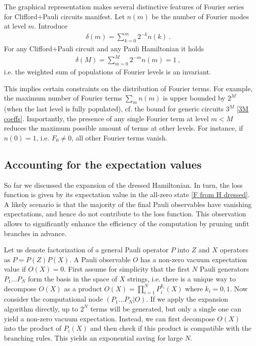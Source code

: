 \documentclass[twocolumn, amsfonts, amssymb, aps, nofootinbib]{revtex4-2}
\newcommand{\CP}{Clifford+Pauli}
\begin{document}
The graphical representation makes several distinctive features of Fourier series for \CP{} circuits manifest. Let $n(m)$ be the number of Fourier modes at level $m$. Introduce
\begin{align}
	\delta(m)=\sum_{k=0}^m2^{-k}n(k) \label{delta def} \ .
\end{align}
For any \CP{} circuit and any Pauli Hamiltonian it holds
\begin{align}
\delta(M)=\sum_{m=0}^M 2^{-m}n(m)=1 \ , \label{invariant}
\end{align}
i.e. the weighted sum of populations of Fourier levels is an invariant. 

This implies certain constraints on the distribution of Fourier terms. For example, the maximum number of Fourier terms $\sum_m n(m)$ is upper bounded by $2^M$ (when the last level is fully populated), cf. the bound for generic circuits $3^M$ \eqref{3M coeffs}. Importantly, the presence of any single Fourier term at level $m<M$ reduces the maximum possible amount of terms at other levels. For instance, if $n(0)=1$, i.e. $F_0\neq0$, all other Fourier terms vanish. 
\subsection{Accounting for the expectation values} \label{sec pruning}
So far we discussed the expansion of the dressed Hamiltonian. In turn, the loss function  is given by its expectation value in the all-zero state \eqref{F from H dressed}. A likely scenario is that the majority of the final Pauli observables have vanishing expectations, and hence do not contribute to the loss function. This observation allows to significantly enhance the efficiency of the computation by pruning unfit branches in advance.

Let us denote factorization of a general Pauli operator $P$ into $Z$ and $X$ operators as $P=P(Z)P(X)$. A Pauli observable $O$ has a non-zero vacuum expectation value if $O(X)=0$. 
First assume for simplicity that the first $N$ Pauli generators $P_1\dots P_N$ form the basis in the space of $X$ strings, i.e. there is a unique way to decompose $O(X)$ as a product $O(X)=\prod_{i=1}^N P^{k_i}_i(X)$ where $k_i=0,1$. Now consider the computational node $(P_1\dots P_N|O)$. If we apply the expansion algorithm directly, up to $2^N$ terms will be generated, but only a single one can yield a non-zero vacuum expectation. Instead, we can first decompose $O(X)$ into the product of $P_i(X)$ and then check if this product is compatible with the branching rules. This yields an exponential saving for large $N$.
\end{document}
